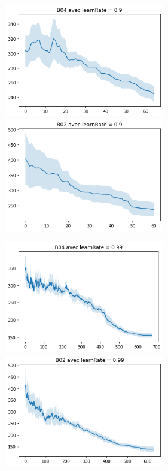\documentclass{article}
\begin{document}
\begin{figure}[H]
	\centerline{ \includegraphics[width=7cm]{images/B04learnrate09.png} \includegraphics[width=7cm]{images/B02learnrate09.png} } 
\end{figure}
\begin{figure}[H]
	\centerline{ \includegraphics[width=7cm]{images/B04learnrate099.png} \includegraphics[width=7cm]{images/B02learnrate099.png} } 
\end{figure}
\end{document}
